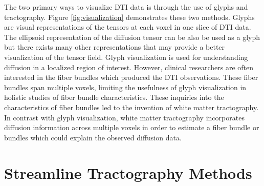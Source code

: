 The two primary ways to visualize DTI data is through the use of glyphs and tractography.  Figure \ref{fig:visualization} demonstrates these two methods.  Glyphs are visual representations of the tensors at each voxel in one slice of DTI data.  The ellipsoid representation of the diffusion tensor can be also be used as a glyph but there exists many other representations that may provide a better visualization of the tensor field.  Glyph visualization is used for understanding diffusion in a localized region of interest.  However, clinical researchers are often interested in the fiber bundles which produced the DTI observations.  These fiber bundles span multiple voxels, limiting the usefulness of glyph visualization in holistic studies of fiber bundle characteristics.  These inquiries into the characteristics of fiber bundles led to the invention of white matter tractography.  In contrast with glyph visualization, white matter tractography incorporates diffusion information across multiple voxels in order to estimate a fiber bundle or bundles which could explain the observed diffusion data.

\section{Streamline Tractography Methods}

